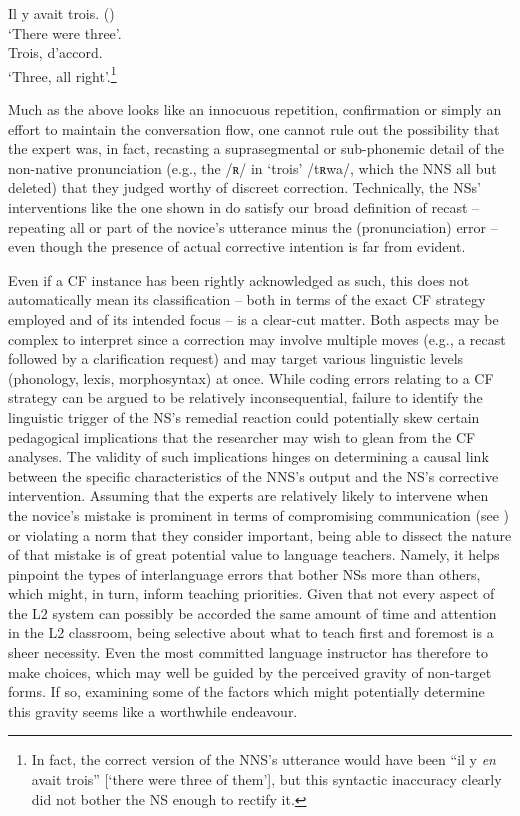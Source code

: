 \documentclass[output=paper,colorlinks,citecolor=brown,modfonts,nonflat]{../langscibook}
\begin{document}
\ea\label{ex:scheuer:10}
{\NNS} {Il} {y} {avait} {trois.}  ()\\
{\TRS} ‘There were three’.\\
{\NS} {Trois,} {d’accord.}\\
{\TRS}‘Three, all right’.\footnote{ {In fact, the correct version of the NNS’s utterance would have been “il y} {\textit{en}} {avait trois” [‘there were three of them’], but this syntactic inaccuracy clearly did not bother the  NS enough to rectify it.}}
\z


Much as the above looks like an innocuous repetition, confirmation or simply an effort to maintain the conversation flow, one cannot rule out the possibility that the expert was, in fact, recasting a suprasegmental or sub-phonemic detail of the non-native pronunciation (e.g., the /ʀ/ in ‘trois’ /tʀwa/, which the NNS all but deleted) that they judged worthy of discreet correction. Technically, the NSs’ interventions like the one shown in  do satisfy our broad definition of recast – repeating all or part of the novice’s utterance minus the (pronunciation) error – even though the presence of actual corrective intention is far from evident.



Even if a CF instance has been rightly acknowledged as such, this does not automatically mean its classification – both in terms of the exact CF strategy employed and of its intended focus – is a clear-cut matter. Both aspects may be complex to interpret since a correction may involve multiple moves (e.g., a recast followed by a clarification request) and may target various linguistic levels (phonology, lexis, morphosyntax) at once. While coding errors relating to a CF strategy can be argued to be relatively inconsequential, failure to identify the linguistic trigger of the NS’s remedial reaction could potentially skew certain pedagogical implications that the researcher may wish to glean from the CF analyses. The validity of such implications hinges on determining a causal link between the specific characteristics of the NNS’s output and the NS’s corrective intervention. Assuming that the experts are relatively likely to intervene when the novice’s mistake is prominent in terms of compromising communication (see ) or violating a norm that they consider important, being able to dissect the nature of that mistake is of great potential value to language teachers. Namely, it helps pinpoint the types of interlanguage errors that bother NSs more than others, which might, in turn, inform teaching priorities. Given that not every aspect of the L2 system can possibly be accorded the same amount of time and attention in the L2 classroom, being selective about what to teach first and foremost is a sheer necessity. Even the most committed language instructor has therefore to make choices, which may well be guided by the perceived gravity of non-target forms. If so, examining some of the factors which might potentially determine this gravity seems like a worthwhile endeavour.
\end{document}
